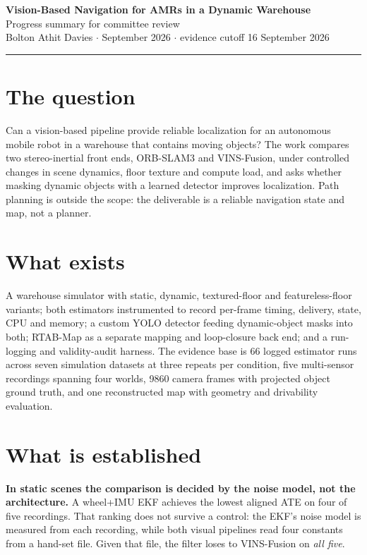 \documentclass[11pt,a4paper]{article}
\begin{document}
\begin{center}
  {\Large\bfseries Vision-Based Navigation for AMRs in a Dynamic Warehouse}\\[0.4em]
  {\large Progress summary for committee review}\\[0.3em]
  Bolton Athit Davies \quad$\cdot$ September 2026 \quad$\cdot$\quad
  evidence cutoff 16 September 2026
\end{center}

\vspace{0.6em}
\noindent\rule{\textwidth}{0.4pt}
\vspace{0.4em}

\section{The question}

Can a vision-based pipeline provide reliable localization for an autonomous
mobile robot in a warehouse that contains moving objects? The work compares two
stereo-inertial front ends, ORB-SLAM3 and VINS-Fusion, under controlled changes
in scene dynamics, floor texture and compute load, and asks whether masking
dynamic objects with a learned detector improves localization. Path planning is
outside the scope: the deliverable is a reliable navigation state and map, not a
planner.

\section{What exists}

A warehouse simulator with static, dynamic, textured-floor and featureless-floor
variants; both estimators instrumented to record per-frame timing, delivery,
state, CPU and memory; a custom YOLO detector feeding dynamic-object masks into
both; RTAB-Map as a separate mapping and loop-closure back end; and a
run-logging and validity-audit harness. The evidence base is 66 logged estimator
runs across seven simulation datasets at three repeats per condition, five
multi-sensor recordings spanning four worlds, \num{9860} camera frames with
projected object ground truth, and one reconstructed map with geometry and
drivability evaluation.

\section{What is established}

\textbf{In static scenes the comparison is decided by the noise model, not the
architecture.} A wheel+IMU EKF achieves the lowest aligned ATE on four of five
recordings. That ranking does not survive a control: the EKF's noise model is
measured from each recording, while both visual pipelines read four constants
from a hand-set file. Given that file, the filter loses to VINS-Fusion on
\emph{all five}.
\end{document}
